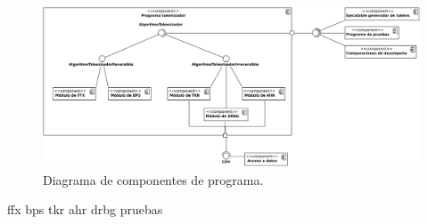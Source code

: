 \begin{figure}
  \begin{center}
    \includegraphics[width=1.0\linewidth]
      {../../../../../diagramas_comunes/disenio/componentes.png}
    \caption{Diagrama de componentes de programa.}
    \label{componentes_general}
  \end{center}
\end{figure}

{ffx}
{bps}
{tkr}
{ahr}
{drbg}
{pruebas}
